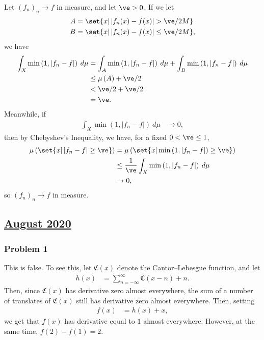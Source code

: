 \documentclass[10pt]{mypackage}
\begin{document}
Let $\left( f_n \right)_n\rightarrow f$ in measure, and let $\ve > 0$. If we let
\begin{align*}
  A &= \set{x | \left\vert f_n(x)-f(x) \right\vert > \ve/2M}\\
  B &= \set{x | \left\vert f_n(x)-f(x) \right\vert \leq \ve/2M},
\end{align*}
we have
\begin{align*}
  \int_{X}^{} \min\left( 1,\left\vert f_n-f \right\vert \right)\:d\mu &= \int_{A}^{} \min\left( 1,\left\vert f_n-f \right\vert \right) \:d\mu + \int_{B}^{} \min\left( 1,\left\vert f_n-f \right\vert \right) \:d\mu\\
                                                                      &\leq \mu\left( A \right) + \ve/2\\
                                                                      &< \ve/2 + \ve/2\\
                                                                      &= \ve.
\end{align*}
Meanwhile, if
\begin{align*}
  \int_{X}^{} \min\left( 1,\left\vert f_n-f \right\vert \right)\:d\mu &\rightarrow 0,
\end{align*}
then by Chebyshev's Inequality, we have, for a fixed $0 < \ve \leq 1$,
\begin{align*}
  \mu\left( \set{x | \left\vert f_n-f \right\vert \geq \ve} \right) &= \mu \left( \set{x | \min\left( 1,\left\vert f_n-f \right\vert \right) \geq \ve} \right)\\
                                                                    &\leq \frac{1}{\ve} \int_{X}^{} \min\left( 1,\left\vert f_n-f \right\vert \right)\:d\mu\\
                                                                    &\rightarrow 0,
\end{align*}
so $\left( f_n \right)_n\rightarrow f$ in measure.
\subsection{\href{https://math.virginia.edu/graduate/exams/analysis/2020Aug_real.pdf}{August 2020}}%
\subsubsection{Problem 1}%
This is false. To see this, let $ \mathfrak{C}(x) $ denote the Cantor--Lebesgue function, and let
\begin{align*}
  h(x) &= \sum_{n=-\infty}^{\infty} \mathfrak{C}\left( x - n \right) + n.
\end{align*}
Then, since $\mathfrak{C}(x)$ has derivative zero almost everywhere, the sum of a number of translates of $\mathfrak{C}(x)$ still has derivative zero almost everywhere. Then, setting
\begin{align*}
  f(x) &= h(x) + x,
\end{align*}
we get that $f(x)$ has derivative equal to $1$ almost everywhere. However, at the same time, $f(2) - f(1) = 2$.
\end{document}
